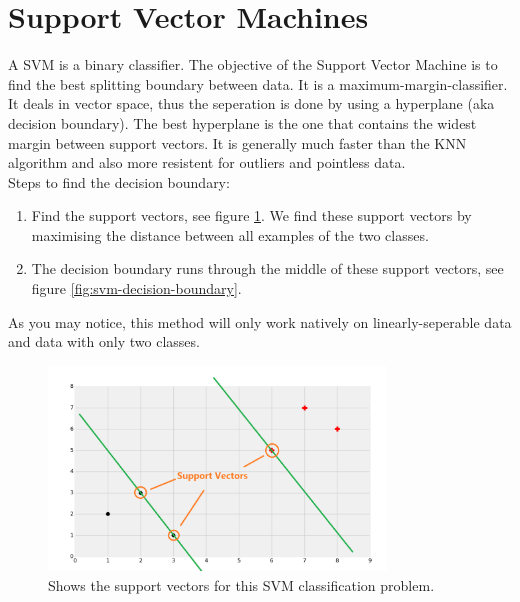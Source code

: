 \section{Support Vector Machines}
A SVM is a binary classifier. The objective of the Support Vector Machine is to find the best splitting boundary between data. It is a maximum-margin-classifier. It deals in vector space, thus the seperation is done by using a hyperplane (aka decision boundary). The best hyperplane is the one that contains the widest margin between support vectors. It is generally much faster than the KNN algorithm and also more resistent for outliers and pointless data.
\\
\noindent Steps to find the decision boundary:
\begin{enumerate}
\item Find the support vectors, see figure \ref{fig:svm-support-vectors}. We find these support vectors by maximising the distance between all examples of the two classes.
\item The decision boundary runs through the middle of these support vectors, see figure \ref{fig:svm-decision-boundary}.
\end{enumerate}

As you may notice, this method will only work natively on linearly-seperable data and data with only two classes. %

\begin{figure}
\centering
\includegraphics[width=0.8\textwidth]{images/svm-support-vectors.png}
\caption{\label{fig:svm-support-vectors} Shows the support vectors for this SVM classification problem.}
\end{figure}


